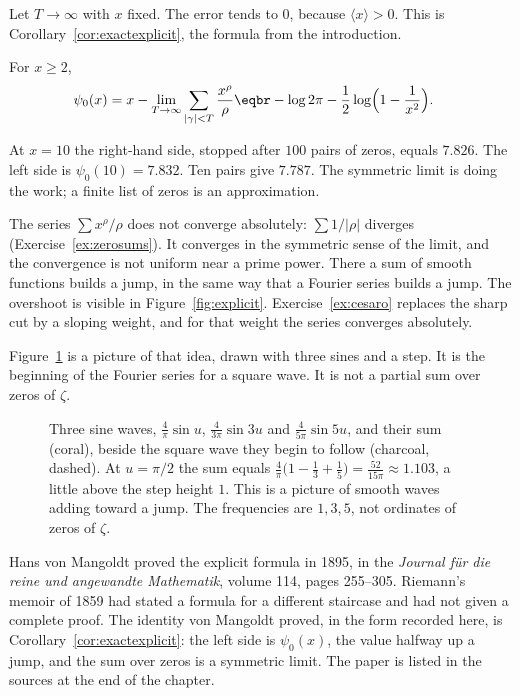 Let $T\to\infty$ with $x$ fixed. The error tends to $0$, because $\langle x\rangle>0$. This is Corollary~\ref{cor:exactexplicit}, the formula from the introduction.

\begin{corollary}\label{cor:exactexplicit}
For $x\ge2$,
\[
\begin{aligned}\psi_0(x)&=x-\lim_{T\to\infty}\sum_{|\gamma|<T}\frac{x^\rho}\rho\eqbr-\log2\pi-\frac12\log\Bigl(1-\frac1{x^2}\Bigr).\end{aligned}
\]
\end{corollary}

At $x=10$ the right-hand side, stopped after $100$ pairs of zeros, equals $7.826$. The left side is $\psi_0(10)=7.832$. Ten pairs give $7.787$. The symmetric limit is doing the work; a finite list of zeros is an approximation.

The series $\sum x^\rho/\rho$ does not converge absolutely: $\sum 1/|\rho|$ diverges (Exercise~\ref{ex:zerosums}). It converges in the symmetric sense of the limit, and the convergence is not uniform near a prime power. There a sum of smooth functions builds a jump, in the same way that a Fourier series builds a jump. The overshoot is visible in Figure~\ref{fig:explicit}. Exercise~\ref{ex:cesaro} replaces the sharp cut by a sloping weight, and for that weight the series converges absolutely.

Figure~\ref{fig:threewaves} is a picture of that idea, drawn with three sines and a step. It is the beginning of the Fourier series for a square wave. It is not a partial sum over zeros of $\zeta$.

\begin{figure}[ht]
\centering
{}
\caption{Three sine waves, $\frac4\pi\sin u$, $\frac4{3\pi}\sin3u$ and $\frac4{5\pi}\sin5u$, and their sum (coral), beside the square wave they begin to follow (charcoal, dashed). At $u=\pi/2$ the sum equals $\frac4\pi\bigl(1-\frac13+\frac15\bigr)=\frac{52}{15\pi}\approx1.103$, a little above the step height $1$. This is a picture of smooth waves adding toward a jump. The frequencies are $1,3,5$, not ordinates of zeros of $\zeta$.}
\label{fig:threewaves}
\end{figure}

\begin{remark}
Hans von Mangoldt proved the explicit formula in 1895, in the \emph{Journal f\"ur die reine und angewandte Mathematik}, volume 114, pages 255--305. Riemann's memoir of 1859 had stated a formula for a different staircase and had not given a complete proof. The identity von Mangoldt proved, in the form recorded here, is Corollary~\ref{cor:exactexplicit}: the left side is $\psi_0(x)$, the value halfway up a jump, and the sum over zeros is a symmetric limit. The paper is listed in the sources at the end of the chapter.
\end{remark}

